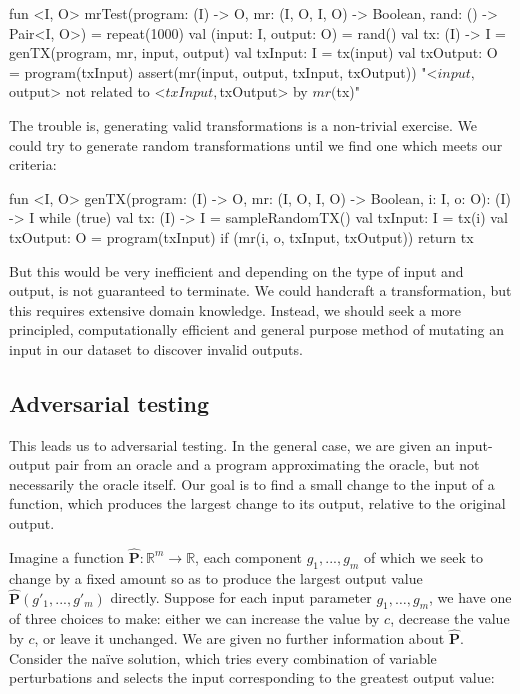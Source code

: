 \begin{kotlinlisting}
fun <I, O> mrTest(program: (I) -> O, mr: (I, O, I, O) -> Boolean, rand: () -> Pair<I, O>) =
    repeat(1000) {
        val (input: I, output: O) = rand()
        val tx: (I) -> I = genTX(program, mr, input, output)
        val txInput: I = tx(input)
        val txOutput: O = program(txInput)
        assert(mr(input, output, txInput, txOutput)) {
            "<$input, $output> not related to <$txInput, $txOutput> by $mr ($tx)"
        }
    }
\end{kotlinlisting}
%
The trouble is, generating valid transformations is a non-trivial exercise. We could try to generate random transformations until we find one which meets our criteria:
%
\begin{kotlinlisting}
fun <I, O> genTX(program: (I) -> O, mr: (I, O, I, O) -> Boolean, i: I, o: O): (I) -> I {
    while (true) {
        val tx: (I) -> I = sampleRandomTX()
        val txInput: I = tx(i)
        val txOutput: O = program(txInput)
        if (mr(i, o, txInput, txOutput)) return tx
    }
}
\end{kotlinlisting}

But this would be very inefficient and depending on the type of input and output, is not guaranteed to terminate. We could handcraft a transformation, but this requires extensive domain knowledge. Instead, we should seek a more principled, computationally efficient and general purpose method of mutating an input in our dataset to discover invalid outputs.

\subsection{Adversarial testing}

This leads us to adversarial testing. In the general case, we are given an input-output pair from an oracle and a program approximating the oracle, but not necessarily the oracle itself. Our goal is to find a small change to the input of a function, which produces the largest change to its output, relative to the original output.

Imagine a function $\mathbf{\hat P}: \mathbb R^m \rightarrow \mathbb R$, each component $g_1, ..., g_{m}$ of which we seek to change by a fixed amount so as to produce the largest output value $\mathbf{\hat P}(g'_1, ..., g'_{m})$ directly. Suppose for each input parameter $g_1, \ldots, g_{m}$, we have one of three choices to make: either we can increase the value by $c$, decrease the value by $c$, or leave it unchanged. We are given no further information about $\mathbf{\hat P}$. Consider the na\"ive solution, which tries every combination of variable perturbations and selects the input corresponding to the greatest output value:

